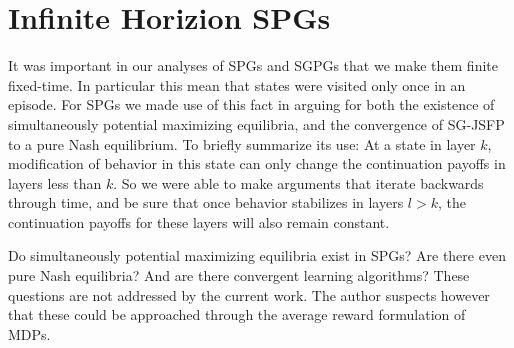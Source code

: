 \section{Infinite Horizion SPGs}

It was important in our analyses of SPGs and SGPGs that we make them finite fixed-time. In particular this mean that states were visited only once in an episode. For SPGs we made use of this fact in arguing for both the existence of simultaneously potential maximizing equilibria, and the convergence of SG-JSFP to a pure Nash equilibrium. To briefly summarize its use: At a state in layer $k$, modification of behavior in this state can only change the continuation payoffs in layers less than $k$. So we were able to make arguments that iterate backwards through time, and be sure that once behavior stabilizes in layers $l > k$, the continuation payoffs for these layers will also remain constant.

Do simultaneously potential maximizing equilibria exist in SPGs? Are there even pure Nash equilibria? And are there convergent learning algorithms? These questions are not addressed by the current work. The author suspects however that these could be approached through the average reward formulation of MDPs.
